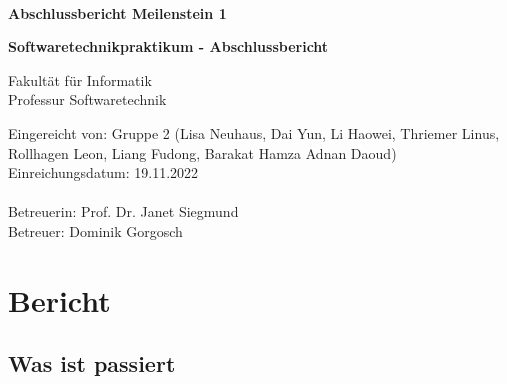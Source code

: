 \documentclass[a4paper, 12pt, oneside, BCOR1cm,toc=chapterentrywithdots]{scrbook}
\begin{document}
\begin{titlepage}

{
    \begin{center}
        \\
    \end{center}
    \vspace{0.5cm}
}

\begin{center}

\LARGE{\textbf{Abschlussbericht Meilenstein 1}}\\
\vspace{1cm}


\Large{\textbf{Softwaretechnikpraktikum - Abschlussbericht}}\\ 
\vspace{1cm}

Fakultät für Informatik\\
Professur Softwaretechnik
\end{center}
\vspace{3cm}
Eingereicht von: Gruppe 2 (Lisa Neuhaus, Dai Yun, Li Haowei, Thriemer Linus, Rollhagen Leon, Liang Fudong, Barakat Hamza Adnan Daoud)\\
Einreichungsdatum: 19.11.2022\\
\vspace{0.3cm}\\
Betreuerin: Prof. Dr. Janet Siegmund \\
Betreuer: Dominik Gorgosch

\end{titlepage}
\chapter{Bericht}
\section*{Was ist passiert}
\end{document}
